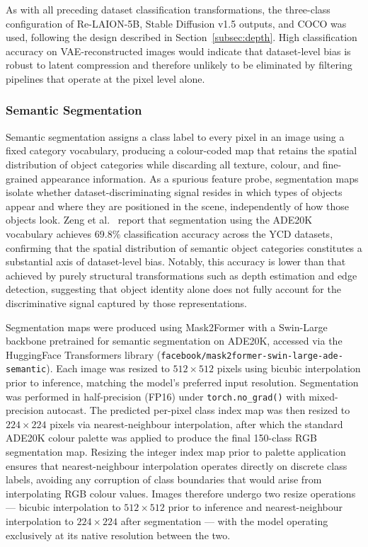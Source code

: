 As with all preceding dataset classification transformations, the three-class 
configuration of Re-LAION-5B, Stable Diffusion v1.5 outputs, and COCO was 
used, following the design described in Section~\ref{subsec:depth}. High 
classification accuracy on VAE-reconstructed images would indicate that 
dataset-level bias is robust to latent compression and therefore unlikely 
to be eliminated by filtering pipelines that operate at the pixel level alone.

\subsubsection{Semantic Segmentation}
Semantic segmentation assigns a class label to every pixel in an image 
using a fixed category vocabulary, producing a colour-coded map that 
retains the spatial distribution of object categories while discarding 
all texture, colour, and fine-grained appearance information. As a 
spurious feature probe, segmentation maps isolate whether 
dataset-discriminating signal resides in which types of objects appear 
and where they are positioned in the scene, independently of how those 
objects look. Zeng et al.\ 
\cite{Zeng_2024_UnderstandingBiasinLargeScaleVisualDatasets} report that 
segmentation using the ADE20K vocabulary \cite{Zhou_2017_ADE20K} achieves 
69.8\% classification accuracy across the YCD datasets, confirming that 
the spatial distribution of semantic object categories constitutes a 
substantial axis of dataset-level bias. Notably, this accuracy is lower 
than that achieved by purely structural transformations such as depth 
estimation and edge detection, suggesting that object identity alone does 
not fully account for the discriminative signal captured by those 
representations.

Segmentation maps were produced using Mask2Former \cite{Cheng_2022_Mask2Former} 
with a Swin-Large backbone pretrained for semantic segmentation on ADE20K, 
accessed via the HuggingFace Transformers library 
(\texttt{facebook/mask2former-swin-large-ade-semantic}). Each image was 
resized to $512 \times 512$ pixels using bicubic interpolation prior to 
inference, matching the model's preferred input resolution. Segmentation 
was performed in half-precision (FP16) under \texttt{torch.no\_grad()} 
with mixed-precision autocast. The predicted per-pixel class index map 
was then resized to $224 \times 224$ pixels via nearest-neighbour 
interpolation, after which the standard ADE20K colour palette was applied 
to produce the final 150-class RGB segmentation map. Resizing the integer 
index map prior to palette application ensures that nearest-neighbour 
interpolation operates directly on discrete class labels, avoiding any 
corruption of class boundaries that would arise from interpolating RGB 
colour values. Images therefore undergo two resize operations — bicubic 
interpolation to $512 \times 512$ prior to inference and nearest-neighbour 
interpolation to $224 \times 224$ after segmentation — with the model 
operating exclusively at its native resolution between the two.

